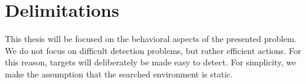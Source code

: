 \section{Delimitations}
\label{sec:delimitations}


This thesis will be focused on the behavioral aspects of the presented problem.
We do not focus on difficult detection problems, but rather efficient actions.
For this reason, targets will deliberately be made easy to detect.
For simplicity, we make the assumption that the searched environment is static. %
